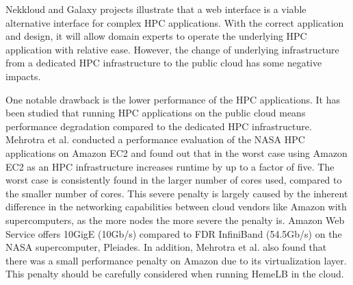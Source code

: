 %
%
%

Nekkloud and Galaxy projects illustrate that a web interface is a viable alternative interface for complex HPC applications. With the correct application and design, it will allow domain experts to operate the underlying HPC application with relative ease. However,  the change of underlying infrastructure from a dedicated HPC infrastructure to the public cloud has some negative impacts.

One notable drawback is the lower performance of the HPC applications. It has been studied that running HPC applications on the public cloud means performance degradation compared to the dedicated HPC infrastructure. Mehrotra et al. \citep{mehrotra2012performance} conducted a performance evaluation of the NASA HPC applications on Amazon EC2 and found out that in the worst case using Amazon EC2 as an HPC infrastructure increases runtime by up to a factor of five. The worst case is consistently found in the larger number of cores used, compared to the smaller number of cores. This severe penalty is largely caused by the inherent difference in the networking capabilities between cloud vendors like Amazon with supercomputers, as the more nodes the more severe the penalty is.  Amazon Web Service offers 10GigE (10Gb/s) compared to FDR InfiniBand (54.5Gb/s) on the NASA supercomputer, Pleiades. In addition, Mehrotra et al. also found that there was a small performance penalty on Amazon due to its virtualization layer. This  penalty should be carefully considered when running HemeLB in the cloud.


